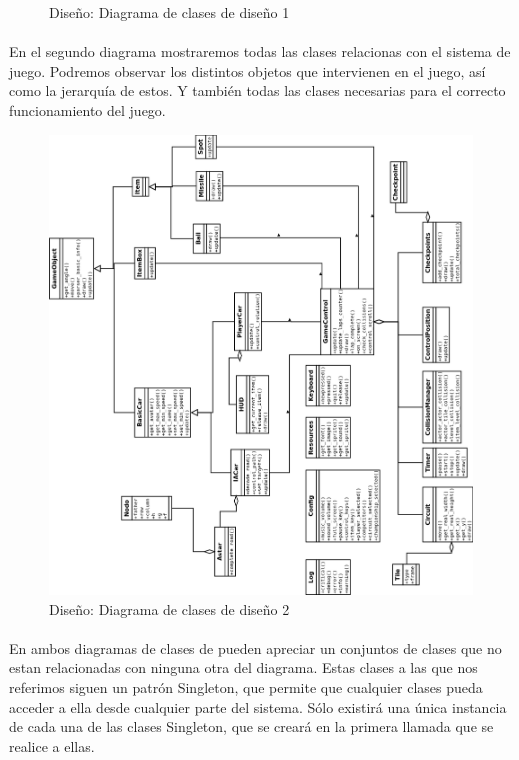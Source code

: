 \begin{figure}[H]
\begin{center}
  \end{center}
  \caption{Diseño: Diagrama de clases de diseño 1}
\end{figure}

\paragraph{}
En el segundo diagrama mostraremos todas las clases relacionas con el sistema de juego. Podremos observar los distintos objetos que
intervienen en el juego, así como la jerarquía de estos. Y también todas las clases necesarias para el correcto funcionamiento del
juego.

\begin{figure}[H]
  \label{diagrama_clases_diseno}
  \begin{center}
    \includegraphics[scale=0.45]{imagenes/diseno/diagrama_clases_diseno2.png}
  \end{center}
  \caption{Diseño: Diagrama de clases de diseño 2}
\end{figure}

\paragraph{}
En ambos diagramas de clases de pueden apreciar un conjuntos de clases que no estan relacionadas con ninguna otra del diagrama. 
Estas clases a las que nos referimos siguen un patrón Singleton, que permite que cualquier clases pueda acceder a ella
desde cualquier parte del sistema. Sólo existirá una única instancia de cada una de las clases Singleton, que se creará en la 
primera llamada que se realice a ellas.
